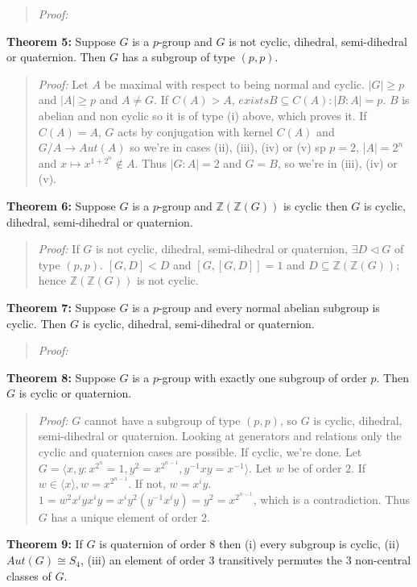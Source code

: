 \begin{quote}
\emph{Proof:}
\end{quote}
{\bf Theorem 5:} Suppose $G$ is a $p$-group and $G$ is not cyclic, dihedral, semi-dihedral or quaternion.  Then
$G$ has a subgroup of type $(p,p)$.
\begin{quote}
\emph{Proof:}  Let $A$ be maximal with respect to being normal and cyclic. $|G| \geq p$ and $|A| \geq p$
and $A \ne G$.  If $C(A) > A$, $exists B \subseteq C(A): |B:A| = p$.  $B$ is abelian and non cyclic so it is
of type (i) above, which proves it.  If $C(A)=A$, $G$ acts by conjugation with kernel $C(A)$ and
$G/A \rightarrow Aut(A)$ so we're in cases (ii), (iii), (iv) or (v) sp $p=2$, $|A|=2^n$ and
$x \mapsto x^{1+2^n} \notin A$.   Thus $|G:A|=2$ and $G=B$, so we're in (iii), (iv) or (v).
\end{quote}
{\bf Theorem 6:} Suppose $G$ is a $p$-group and ${\mathbb Z}({\mathbb Z}(G))$ is cyclic then $G$ is cyclic,
dihedral, semi-dihedral or quaternion.
\begin{quote}
\emph{Proof:}
If $G$ is not cyclic,
dihedral, semi-dihedral or quaternion, $\exists D \lhd G$ of type $(p,p)$. $[G,D] < D$ and $[G,[G,D]] = 1$ and
$ D \subseteq {\mathbb Z}({\mathbb Z}(G))$;
hence ${\mathbb Z}({\mathbb Z}(G))$ is not cyclic.
\end{quote}
{\bf Theorem 7:} Suppose $G$ is a $p$-group and every normal abelian subgroup is cyclic.  Then $G$ is cyclic,
dihedral, semi-dihedral or quaternion.
\begin{quote}
\emph{Proof:}
\end{quote}
{\bf Theorem 8:} Suppose $G$ is a $p$-group with exactly one subgroup of order $p$. Then $G$ is cyclic or quaternion.
\begin{quote}
\emph{Proof:}
$G$ cannot have a subgroup of type $(p,p)$, so $G$ is cyclic, dihedral, semi-dihedral or quaternion.
Looking at generators and relations only the cyclic and quaternion cases are possible.  If cyclic, we're done.
Let $G = \langle x,y: x^{2^n} =1, y^2 = x^{2^{n-1}}, y^{-1}xy = x^{-1} \rangle$.  Let $w$ be of order $2$.
If $w \in \langle x \rangle, w = x^{2^{n-1}}$.  If not, $w= x^iy$.
$1 = w^2 x^i y x^i y = x^i y^2 (y^{-1}x^i y)= y^2 = x^{2^{n-1}}$, which is a contradiction.  Thus $G$ has a
unique element of order $2$.
\end{quote}
{\bf Theorem 9:} If $G$ is quaternion of order $8$ then (i) every subgroup is cyclic, (ii) $Aut(G) \cong S_4$,
(iii) an element of order $3$ transitively permutes the $3$ non-central classes of $G$.

